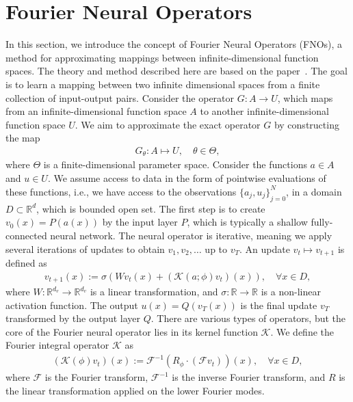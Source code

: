 \section{Fourier Neural Operators}
In this section, we introduce the concept of Fourier Neural Operators (FNOs), a method for approximating mappings between infinite-dimensional function spaces.
The theory and method described here are based on the paper~\cite{FNO_2021}.
The goal is to learn a mapping between two infinite dimensional spaces from a finite collection of input-output pairs. 
Consider the operator $G: A \to U$, which maps from an infinite-dimensional function space $A$ to another infinite-dimensional function space $U$.
We aim to approximate the exact operator $G$ by constructing the map
\begin{align*}
    G_{\theta}: A \mapsto U, \quad \theta \in \Theta,
\end{align*} 
where $\Theta$ is a finite-dimensional parameter space.
Consider the functions $a \in A$ and $u \in U$.
We assume access to data in the form of pointwise evaluations of these functions, i.e., we have access to the observations ${\{a_j, u_j \}}_{j=0}^N$, in a domain $D \subset \mathbb{R}^d$, which is bounded open set.
The first step is to create $v_0(x) = P(a(x))$ by the input layer $P$, which is typically a shallow fully-connected neural network.
The neural operator is iterative, meaning we apply several iterations of updates to obtain $v_1, v_2, \ldots$ up to $v_T$.
An update $v_t \mapsto v_{t+1}$ is defined as
\begin{align}
    v_{t+1}(x) := \sigma \left( W v_t(x) + \left( \mathcal{K}(a;\phi)v_t \right) (x) \right), \quad \forall x \in D,
\end{align}
where $W: \mathbb{R}^{d_v} \to \mathbb{R}^{d_v}$ is a linear transformation, and $\sigma: \mathbb{R} \to \mathbb{R}$ is a non-linear activation function.
The output $u(x) = Q(v_T(x))$ is the final update $v_T$ transformed by the output layer $Q$.
There are various types of operators, but the core of the Fourier neural operator lies in its kernel function $\mathcal{K}$.
We define the Fourier integral operator $\mathcal{K}$ as 
\begin{align}
    \left( \mathcal{K}(\phi)v_t \right) (x) := \mathcal{F}^{-1} \left( R_{\phi} \cdot (\mathcal{F}v_t ) \right)(x), \quad \forall x \in D,
\end{align}
where $\mathcal{F}$ is the Fourier transform, $\mathcal{F}^{-1}$ is the inverse Fourier transform, and $R$ is the linear transformation applied on the lower Fourier modes. 

